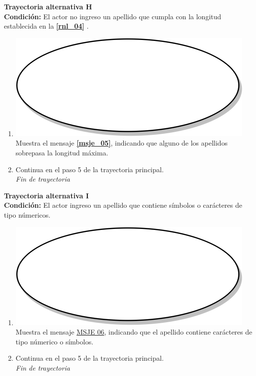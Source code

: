 \textbf{Trayectoria alternativa H} \label{cu2_ta_h}\\
\textbf{Condición:} El actor no ingreso un apellido que cumpla con la longitud establecida en la \textbf{\ref{rnl_04}} .\\
 \begin{enumerate}[label=H\arabic*]
    \item {\includegraphics[scale=.05]{Capitulo3/img/proceso.png} Muestra el mensaje \textbf{\ref{msje_05}}, indicando que alguno de los apellidos sobrepasa la longitud máxima.}
    \item {Continua en el paso 5 de la trayectoria principal.} \\
    \textit{Fin de trayectoria} \\
\end{enumerate}

\textbf{Trayectoria alternativa I} \label{cu2_ta_i}\\
\textbf{Condición:} El actor ingreso un apellido que contiene símbolos o carácteres de tipo númericos.\\
 \begin{enumerate}[label=I\arabic*]
    \item {\includegraphics[scale=.05]{Capitulo3/img/proceso.png} Muestra el mensaje \hyperref[msje_06]{MSJE 06}, indicando que el apellido contiene carácteres de tipo númerico o símbolos.}
    \item {Continua en el paso 5 de la trayectoria principal.} \\
    \textit{Fin de trayectoria} \\
\end{enumerate}

